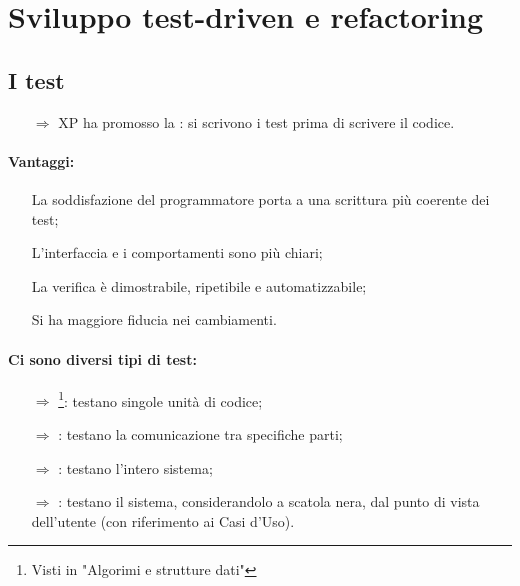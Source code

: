 \section{Sviluppo test-driven e refactoring}

\subsection{I test}

\begin{itemize}
    \item [$\Rightarrow$] XP ha promosso la :
    si scrivono i test prima di scrivere il codice.
\end{itemize}



\paragraph{Vantaggi:}

\begin{itemize}
    \item [\textcolor{dkgreen}{\checkmark}]  La soddisfazione del programmatore
    porta a una scrittura più coerente dei test;
    \item [\textcolor{dkgreen}{\checkmark}]  L'interfaccia e i comportamenti
    sono più chiari;
    \item [\textcolor{dkgreen}{\checkmark}] La verifica è dimostrabile,
    ripetibile e automatizzabile;
    \item [\textcolor{dkgreen}{\checkmark}] Si ha maggiore fiducia nei cambiamenti.
\end{itemize}

\paragraph{Ci sono diversi tipi di test:}

\begin{itemize}
    \item [$\Rightarrow$] \footnote{Visti in "Algorimi e strutture dati"}: testano singole unità di codice;
    \item [$\Rightarrow$] : testano la comunicazione tra specifiche parti;
    \item [$\Rightarrow$] : testano l'intero sistema;
    \item [$\Rightarrow$] : testano il sistema, considerandolo a scatola nera, dal punto di vista dell'utente (con riferimento ai Casi d'Uso).
\end{itemize}


